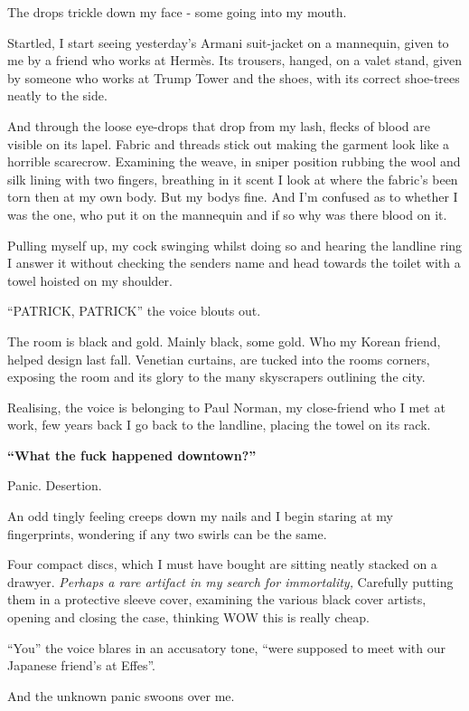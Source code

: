 \documentclass[19pt,openany]{book}
\begin{document}
The drops trickle down my face -
some going into my mouth.

Startled, I start
seeing yesterday's
Armani suit-jacket
on a mannequin, given
to me by a friend who works
at Hermès. Its trousers, hanged, on
a valet stand, given by someone who
works at Trump Tower and the shoes,
with its correct shoe-trees
neatly to the side.

And through
the loose eye-drops that drop
from my lash,
flecks of blood
are visible on its lapel. Fabric
and threads stick out making
the garment look like a horrible
scarecrow. Examining the weave,
in sniper position rubbing the
wool and silk lining
with two fingers, breathing
in it scent I look at where
the fabric's been torn then at
my own body.
But my bodys fine. And
I'm confused as to whether I was
the one, who put it on the mannequin
and if so why was there blood on it.

Pulling myself up,
my cock swinging whilst doing so
and hearing the
landline ring I answer it
without checking the senders name
and head towards the toilet with
a towel hoisted on my shoulder.

``PATRICK, PATRICK'' the
voice blouts out.

The room is black and gold. Mainly
black, some gold. Who my Korean
friend, helped design last fall.
Venetian curtains, are tucked
into the rooms corners,
exposing the room and its glory
to the many skyscrapers outlining
the city.

Realising, the voice
is belonging to Paul Norman, my close-friend
who I met at work, few years back I
go back to the landline, placing the
towel on its rack.

\textbf{``What the fuck happened downtown?''}

Panic. Desertion.

An odd tingly
feeling creeps down my nails and
I begin staring at my fingerprints,
wondering if any two swirls can be
the same.

Four compact discs, which
I must have bought are
sitting neatly stacked on a drawyer.
\textit{Perhaps a rare
artifact in my search for immortality,}
Carefully putting them in a protective
sleeve cover, examining the various black
cover artists, opening and closing
the case, thinking WOW this is really
cheap.

``You'' the voice blares in an
accusatory tone, ``were supposed to meet with our
Japanese friend's at Effes''.

And the unknown panic swoons over me.
\end{document}
